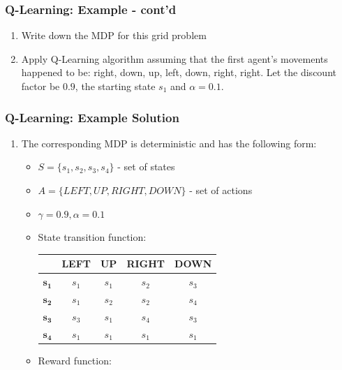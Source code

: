 \begin{frame}
	\frametitle{Q-Learning: Example - cont'd}
	
	\Large
	
	\begin{enumerate}
		\item Write down the MDP for this grid problem
		\item Apply Q-Learning algorithm assuming that the first agent's movements happened
			  to be: right, down, up, left, down, right, right. Let the discount factor be
			  $ 0.9 $, the starting state $ s_1 $ and $ \alpha = 0.1 $.
	\end{enumerate}
\end{frame}

\begin{frame}[<+->]
	\frametitle{Q-Learning: Example Solution}
	
	\vspace{0.4cm}
	
	\begin{enumerate}
		\item The corresponding MDP is deterministic and has the following form:
			  
			  \begin{itemize}
				  \item $ S = \{ s_1, s_2, s_3, s_4 \} $ - set of states
				  \vspace{0.15cm}
				  \item $ A = \{ LEFT, UP, RIGHT, DOWN \} $ - set of actions
				  \vspace{0.15cm}
				  \item $ \gamma = 0.9, \alpha = 0.1 $
				  \vspace{0.15cm}
				  \item State transition function:
						
						\begin{table}[!h]
							\scriptsize
							\begin{tabular}{c|c|c|c|c|}
								\cline{2-5}
								& \textbf{LEFT} & \textbf{UP} & \textbf{RIGHT} &
								\textbf{DOWN} \\ \hline
								\multicolumn{1}{|c|}{$ \mathbf{s_1} $} & $ s_1 $ & $ s_1 $
								& $ s_2 $ & $ s_3 $ \\ \hline
								\multicolumn{1}{|c|}{$ \mathbf{s_2} $} & $ s_1 $ & $ s_2 $
								& $ s_2 $ & $ s_4 $ \\ \hline
								\multicolumn{1}{|c|}{$ \mathbf{s_3} $} & $ s_3 $ & $ s_1 $    
								& $ s_4 $ & $ s_3 $ \\ \hline
								\multicolumn{1}{|c|}{$ \mathbf{s_4} $} & $ s_1 $ & $ s_1 $    
								& $ s_1 $ & $ s_1 $ \\ \hline
							\end{tabular}
						\end{table}
				  \vspace{0.15cm}
				  \item Reward function:
						

\end{itemize}
\end{enumerate}
\end{frame}
